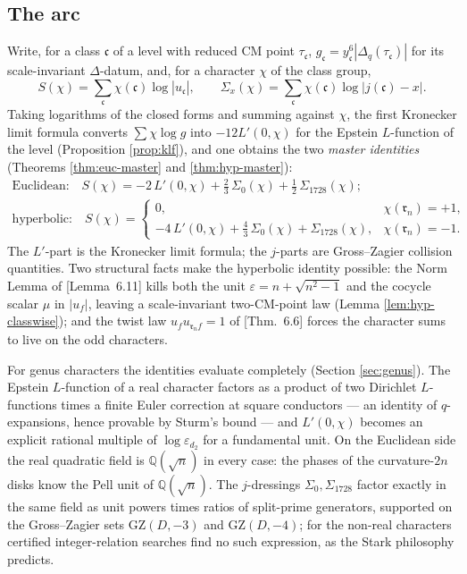 \documentclass[11pt]{amsart}
\numberwithin{equation}{section}
\theoremstyle{plain}
\theoremstyle{definition}
\theoremstyle{remark}
\newcommand{\Q}{\mathbb{Q}}
\newcommand{\idealc}{\mathfrak{c}}
\newcommand{\idealr}{\mathfrak{r}}
\newcommand{\GZ}{\mathrm{GZ}}
\newcommand{\eps}{\varepsilon}
\newcommand{\PaperI}{\cite{SchmidtI}}
\begin{document}
\subsection*{The arc}
Write, for a class $\idealc$ of a level with reduced CM point
$\tau_\idealc$, $g_\idealc = y_\idealc^6|\Delta_q(\tau_\idealc)|$ for its
scale-invariant $\Delta$-datum, and, for a character $\chi$ of the class
group,
\[
  S(\chi) = \sum_\idealc\chi(\idealc)\log|u_\idealc|,
  \qquad
  \Sigma_x(\chi) = \sum_\idealc\chi(\idealc)\log|j(\idealc) - x| .
\]
Taking logarithms of
the closed forms and summing against $\chi$, the first Kronecker limit
formula converts $\sum\chi\log g$ into $-12L'(0,\chi)$ for the Epstein
$L$-function of the level (Proposition \ref{prop:klf}), and one obtains
the two \emph{master identities} (Theorems \ref{thm:euc-master} and
\ref{thm:hyp-master}):
\begin{gather*}
  \text{Euclidean:}\quad
  S(\chi) = -2\,L'(0,\chi) + \tfrac23\,\Sigma_0(\chi) + \tfrac12\,\Sigma_{1728}(\chi);\\
  \text{hyperbolic:}\quad
  S(\chi) = \begin{cases} 0, & \chi(\idealr_n) = +1,\\
  -4\,L'(0,\chi) + \tfrac43\,\Sigma_0(\chi) + \Sigma_{1728}(\chi), &
  \chi(\idealr_n) = -1.\end{cases}
\end{gather*}
The $L'$-part is the Kronecker limit formula; the $j$-parts are
Gross--Zagier collision quantities.  Two structural facts make the
hyperbolic identity possible: the Norm Lemma of \PaperI[Lemma~6.11] kills
both the unit $\eps = n + \sqrt{n^2-1}$ and the cocycle scalar $\mu$ in
$|u_f|$, leaving a scale-invariant two-CM-point law (Lemma
\ref{lem:hyp-classwise}); and the twist law $u_fu_{\idealr_nf} = 1$ of
\PaperI[Thm.~6.6] forces the character sums to live on the odd
characters.

For genus characters the identities evaluate completely (Section
\ref{sec:genus}).  The Epstein $L$-function of a real character factors
as a product of two Dirichlet $L$-functions times a finite Euler
correction at square conductors --- an identity of $q$-expansions, hence
provable by Sturm's bound --- and $L'(0,\chi)$ becomes an explicit
rational multiple of $\log\eps_{d_2}$ for a fundamental unit.  On the
Euclidean side the real quadratic field is $\Q(\sqrt n)$ in every case:
the phases of the curvature-$2n$ disks know the Pell unit of $\Q(\sqrt n)$.
The $j$-dressings $\Sigma_0, \Sigma_{1728}$ factor exactly in the same
field as unit powers times ratios of split-prime generators, supported on
the Gross--Zagier sets $\GZ(D,-3)$ and $\GZ(D,-4)$; for the non-real
characters certified integer-relation searches find no such expression,
as the Stark philosophy predicts.
\end{document}
